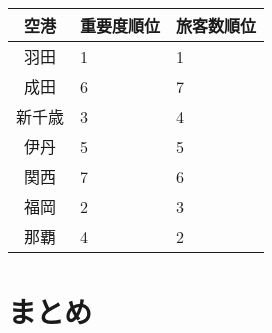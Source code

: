 \documentclass[a4j, dvipdfmx, twocolumn]{jsarticle}
\begin{document}
\begin{table}[htb]
  \begin{tabular}{cll}
    \hline
    空港 & 重要度順位 & 旅客数順位 \\
    \hline
    \hline
    羽田 & 1 & 1 \\
    成田 & 6 & 7 \\
    新千歳 & 3 & 4 \\
    伊丹 & 5 & 5 \\
    関西 & 7 & 6 \\
    福岡 & 2 & 3 \\
    那覇 & 4 & 2 \\
    \hline
  \end{tabular}
\centering
\caption{}
\end{table}

\section{まとめ}




\end{document}
